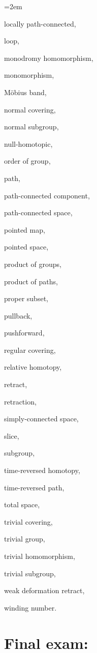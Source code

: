 {\begin{list}{}{\leftmargin=2em}
  \item locally path-connected,
  \item loop,
  \item monodromy homomorphism,
  \item monomorphism,
  \item Möbius band,
  \item normal covering,
  \item normal subgroup,
  \item null-homotopic,
  \item order of group,
  \item path,
  \item path-connected component,
  \item path-connected space,
  \item pointed map,
  \item pointed space,
  \item product of groups,
  \item product of paths,
  \item proper subset,
  \item pullback,
  \item pushforward,
  \item regular covering,
  \item relative homotopy,
  \item retract,
  \item retraction,
  \item simply-connected space,
  \item slice,
  \item subgroup,
  \item time-reversed homotopy,
  \item time-reversed path,
  \item total space,
  \item trivial covering,
  \item trivial group,
  \item trivial homomorphism,
  \item trivial subgroup,
  \item weak deformation retract,
  \item winding number.
\end{list}
}
\spell{\end{multicols}}{}

\newpage

\section*{Final exam:}
\label{Final}

